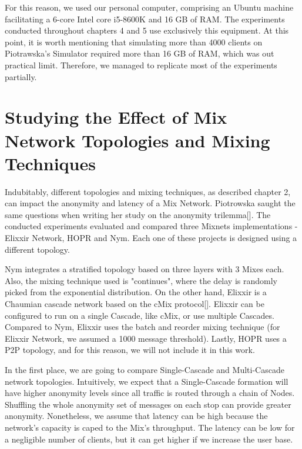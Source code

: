 \documentclass[logo,msc,cyber]{infthesis}   %
\begin{document}
For this reason, we used our personal computer, comprising an Ubuntu machine
facilitating a 6-core Intel core i5-8600K and 16 GB of RAM. The experiments
conducted throughout chapters 4 and 5 use exclusively this equipment. At this
point, it is worth mentioning that simulating more than 4000 clients on
Piotrawska's Simulator required more than 16 GB of RAM, which was out practical
limit. Therefore, we managed to replicate most of the experiments partially. 

\section{Studying the Effect of Mix Network Topologies and Mixing Techniques}

Indubitably, different topologies and mixing techniques, as described chapter 2,
can impact the anonymity and latency of a Mix Network. Piotrowska saught the
same questions when writing her study on the anonymity trilemma[]. The conducted
experiments evaluated and compared three Mixnets implementations - Elixxir
Network, HOPR and Nym. Each one of these projects is designed using a different
topology. 

Nym integrates a stratified topology based on three layers with 3 Mixes each.
Also, the mixing technique used is "continues", where the delay is randomly
picked from the exponential distribution. On the other hand, Elixxir is a
Chaumian cascade network based on the cMix protocol[]. Elixxir can be configured
to run on a single Cascade, like cMix, or use multiple Cascades. Compared to
Nym, Elixxir uses the batch and reorder mixing technique (for Elixxir Network,
we assumed a 1000 message threshold). Lastly, HOPR uses a P2P topology, and for
this reason, we will not include it in this work.


In the first place, we are going to compare Single-Cascade and Multi-Cascade
network topologies. Intuitively, we expect that a Single-Cascade formation will
have higher anonymity levels since all traffic is routed through a chain of
Nodes. Shuffling the whole anonymity set of messages on each stop can provide
greater anonymity. Nonetheless, we assume that latency can be high because the
network's capacity is caped to the Mix's throughput. The latency can be low for
a negligible number of clients, but it can get higher if we increase the user
base.
\end{document}
